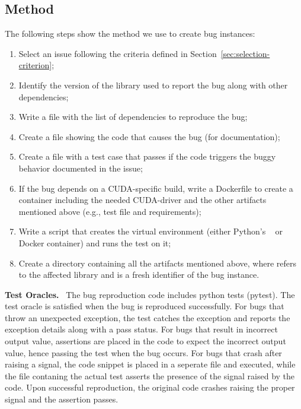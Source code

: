 \documentclass[sigconf,screen]{acmart}
\begin{document}
\subsection{Method}
\label{sec:method}
The following steps show the method we use to create bug instances:
\vspace{-5mm}
\begin{enumerate}[leftmargin=0.5cm]
  \item Select an issue following the criteria defined in Section~\ref{sec:selection-criterion};
  \item Identify the version of the library used to report the bug along with other dependencies;
  \item Write a  file with the list of dependencies to reproduce the bug;
  \item Create a file showing the code that causes the bug (for documentation);
  \item Create a file with a  test case that passes if
    the code triggers the buggy behavior documented in the issue;
  \item If the bug depends on a CUDA-specific build, write a
    Dockerfile to create a container including the needed CUDA-driver
    and the other artifacts mentioned above (e.g., test file and
    requirements);
  \item Write a script that creates the virtual environment (either
    Python's ~\cite{venv} or Docker container) and runs
    the test on it;
  \item Create a directory  containing all the
    artifacts mentioned above, where  refers to the
    affected library and  is a fresh identifier of the
    bug instance.
\end{enumerate}
\textbf{Test Oracles.}~
The bug reproduction code includes python tests (pytest). The test
oracle is satisfied when the bug is reproduced successfully. For bugs
that throw an unexpected exception, the test catches the exception and
reports the exception details along with a pass status. For bugs that
result in incorrect output value, assertions are placed in the code to
expect the incorrect output value, hence passing the test when the bug
occurs. For bugs that crash after raising a signal, the code snippet
is placed in a seperate file and executed, while the file contaning
the actual test asserts the presence of the signal raised by the
code. Upon successful reproduction, the original code crashes raising
the proper signal and the assertion passes.
\end{document}
